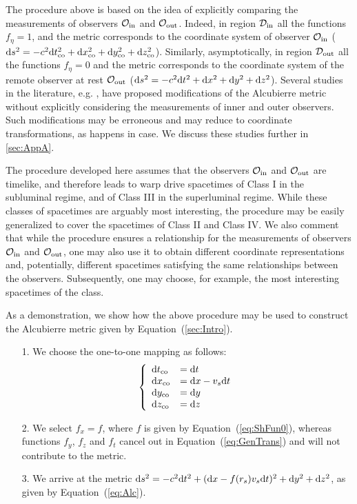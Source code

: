 \documentclass[10pt]{iopart}
\begin{document}
The procedure above is based on the idea of explicitly comparing the measurements of observers $\mathcal{O}_{\rm in}$ and $\mathcal{O}_{\rm out}$. Indeed, in region $\mathcal{D}_{\rm in}$ all the functions $f_{\eta}=1$, and the metric corresponds to the coordinate system of observer $\mathcal{O}_{\rm in}$ (${\rm d}s^2=-c^2 {\rm d} t_{\rm co}^2 + {\rm d} x_{\rm co}^2 + {\rm d} y_{\rm co}^2 + {\rm d} z_{\rm co}^2$). Similarly, asymptotically, in region $\mathcal{D}_{\rm out}$ all the functions $f_{\eta}=0$ and the metric corresponds to the coordinate system of the remote observer at rest $\mathcal{O}_{\rm out}$ (${\rm d}s^2=-c^2 {\rm d} t^2 + {\rm d} x^2 + {\rm d} y^2 + {\rm d} z^2$). Several studies in the literature, e.g. \cite{Loup2001}, have proposed modifications of the Alcubierre metric without explicitly considering the measurements of inner and outer observers. Such modifications may be erroneous and may reduce to coordinate transformations, as happens in \cite{Loup2001} case. We discuss these studies further in \ref{sec:AppA}.

The procedure developed here assumes that the observers $\mathcal{O}_{\rm in}$ and $\mathcal{O}_{\rm out}$ are timelike, and therefore leads to warp drive spacetimes of Class I in the subluminal regime, and of Class III in the superluminal regime. While these classes of spacetimes are arguably most interesting, the procedure may be easily generalized to cover the spacetimes of Class II and Class IV. We also comment that while the procedure ensures a relationship for the measurements of observers $\mathcal{O}_{\rm in}$ and $\mathcal{O}_{\rm out}$, one may also use it to obtain different coordinate representations and, potentially, different spacetimes satisfying the same relationships between the observers. Subsequently, one may choose, for example, the most interesting spacetimes of the class.

As a demonstration, we show how the above procedure may be used to construct the Alcubierre metric given by Equation~(\ref{sec:Intro}).

\begin{itemize}
    \item[1.] We choose the one-to-one mapping as follows:
    \begin{equation}
\left\{
\begin{array}{lll}
    {\rm d}t_{\rm co}&={\rm d}t\\
    {\rm d}x_{\rm co}&={\rm d}x - v_s{\rm d}t\\
    {\rm d}y_{\rm co}&={\rm d}y\\
    {\rm d}z_{\rm co}&={\rm d}z\\
    \end{array}
    \right.
\end{equation}
    \item[2.] We select $f_x=f$, where $f$ is given by Equation~(\ref{eq:ShFun0}), whereas functions $f_y$, $f_z$ and $f_t$ cancel out in Equation~(\ref{eq:GenTrans}) and will not contribute to the metric.
    \item[3.] We arrive at the metric ${\rm d}s^2=-c^2 {\rm d} t^2 + ({\rm d}x-f(r_s)v_s {\rm d}t)^2+{\rm d}y^2 + {\rm d}z^2$, as given by Equation~(\ref{eq:Alc}).
\end{itemize}
\end{document}
